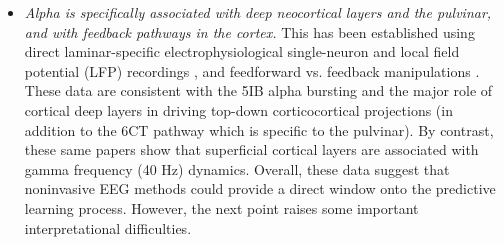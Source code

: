 \documentclass[11pt,twoside]{article}
\newif\myifpdf
\begin{document}
\begin{itemize}
	\item \emph{Alpha is specifically associated with deep neocortical layers and the pulvinar, and with feedback pathways in the cortex.}  This has been established using direct laminar-specific electrophysiological single-neuron and local field potential (LFP) recordings \citep{LuczakBarthoHarris13,BuffaloFriesLandmanEtAl11,MaierAdamsAuraEtAl10,MaierAuraLeopold11,SpaakBonnefondMaierEtAl12,XingYehBurnsEtAl12}, and feedforward vs. feedback manipulations \citep{vonSteinChiangKonig00,vanKerkoerleSelfDagninoEtAl14,BastosVezoliBosmanEtAl15,JensenBonnefondMarshallEtAl15,MichalareasVezolivanPeltEtAl16}.  	These data are consistent with the 5IB alpha bursting and the major role of cortical deep layers in driving top-down corticocortical projections (in addition to the 6CT pathway which is specific to the pulvinar).  By contrast, these same papers show that superficial cortical layers are associated with gamma frequency (40 Hz) dynamics.  Overall, these data suggest that noninvasive EEG methods could provide a direct window onto the predictive learning process.  However, the next point raises some important interpretational difficulties.
	

\end{itemize}
\end{document}
